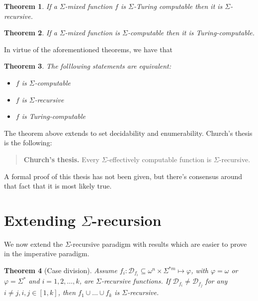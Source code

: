 \documentclass[a4paper, 12pt]{article}
\newtheorem{theorem}{Theorem}
\newtheorem{theorem}{Theorem}
\begin{document}
\begin{theorem}
    If a $\Sigma$-mixed function $f$ is $\Sigma$-Turing computable then it is
    $\Sigma$-recursive.
\end{theorem}

\begin{theorem}
    If a $\Sigma$-mixed function is $\Sigma$-computable then it is
    Turing-computable.
\end{theorem}

In virtue of the aforementioned theorems, we have that

\begin{theorem}
    The folllowing statements are equivalent: 

    \begin{itemize}
        \item $f$ is $\Sigma$-computable 
        \item $f$ is $\Sigma$-recursive  
        \item $f$ is Turing-computable  
    \end{itemize}
\end{theorem}

The theorem above extends to set decidability and enumerability. Church's thesis
is the following: 

\begin{quote}
    \textbf{Church's thesis.} Every $\Sigma$-effectively computable function is
    $\Sigma$-recursive.
\end{quote}

A formal proof of this thesis has not been given, but there's consensus around
that fact that it is most likely true.

\pagebreak
\section{Extending $\Sigma$-recursion}

We now extend the $\Sigma$-recursive paradigm with results which are easier to
prove in the imperative paradigm. 

\begin{theorem}[Case division]
    Assume $f_i : \mathcal{D}_{f_i} \subseteq \omega^{n} \times \Sigma^{*m}
    \mapsto \varphi$, with $\varphi = \omega$ or $\varphi = \Sigma^{*}$ and $i =
    1, 2, \ldots, k$, are $\Sigma$-recursive functions. If
    $\mathcal{D}_{f_i} \neq \mathcal{D}_{f_j}$ for any $i \neq j, i,j \in [1, k]$, then
    $f_1 \cup \ldots \cup  f_k$ is $\Sigma$-recursive.
\end{theorem}
\end{document}

